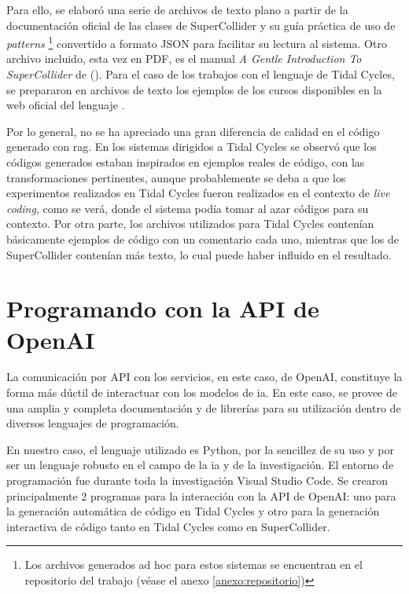 Para ello, se elaboró una serie de archivos de texto plano a partir de la documentación oficial de las clases de SuperCollider y su guía práctica de uso de \emph{patterns} \citep{SuperCollider12Help} \footnote{Los archivos generados ad hoc para estos sistemas se encuentran en el repositorio del trabajo (véase el anexo \ref{anexo:repositorio})} convertido a formato JSON para facilitar su lectura al sistema. Otro archivo incluido, esta vez en PDF, es el manual \emph{A Gentle Introduction To SuperCollider} de \citeauthor{ruviaroGentleIntroductionSuperCollider2015} (\citeyear{ruviaroGentleIntroductionSuperCollider2015}). Para el caso de los trabajos con el lenguaje de Tidal Cycles, se prepararon en archivos de texto los ejemplos de los cursos disponibles en la web oficial del lenguaje \citep{LiveCodeTidal}.

Por lo general, no se ha apreciado una gran diferencia de calidad en el código generado con \gls{rag}. En los sistemas dirigidos a Tidal Cycles se observó que los códigos generados estaban inspirados en ejemplos reales de código, con las transformaciones pertinentes, aunque probablemente se deba a que los experimentos realizados en Tidal Cycles fueron realizados en el contexto de \emph{live coding}, como se verá, donde el sistema podía tomar al azar códigos para su contexto. Por otra parte, los archivos utilizados para Tidal Cycles contenían básicamente ejemplos de código con un comentario cada uno, mientras que los de SuperCollider contenían más texto, lo cual puede haber influido en el resultado.


\section{Programando con la API de OpenAI}

La comunicación por API con los servicios, en este caso, de OpenAI, constituye la forma más dúctil de interactuar con los modelos de \gls{ia}. En este caso, se provee de una amplia y completa documentación y de librerías para su utilización dentro de diversos lenguajes de programación.

En nuestro caso, el lenguaje utilizado es Python, por la sencillez de su uso y por ser un lenguaje robusto en el campo de la \gls{ia} y de la investigación. El entorno de programación fue durante toda la investigación Visual Studio Code. Se crearon principalmente 2 programas para la interacción con la API de OpenAI: uno para la generación automática de código en Tidal Cycles y otro para la generación interactiva de código tanto en Tidal Cycles como en SuperCollider.


